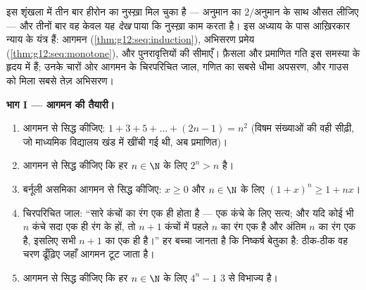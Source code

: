 \begin{problem}
\label{pb:g12:seq:1}
इस शृंखला में तीन बार हीरोन का नुस्ख़ा मिल चुका है --- अनुमान का $2/\text{अनुमान}$ के साथ
औसत लीजिए --- और तीनों बार वह केवल यह \emph{देख} पाया कि नुस्ख़ा काम करता
है। इस अध्याय के पास आख़िरकार न्याय के यंत्र हैं: आगमन (\cref{thm:g12:seq:induction}), 
अभिसरण प्रमेय (\cref{thm:g12:seq:monotone}), और पुनरावृत्तियों की सीमाएँ। फ़ैसला और प्रमाणित गति
इस समस्या के हृदय में हैं; उनके चारों ओर आगमन के चिरपरिचित जाल, गणित का
सबसे धीमा अपसरण, और गाउस को मिला सबसे तेज़ अभिसरण।

\medskip
\noindent\textbf{भाग I --- आगमन की तैयारी।}
\begin{enumerate}
  \item आगमन से सिद्ध कीजिए: $1 + 3 + 5 + \dots + (2n - 1) = n^2$ (विषम संख्याओं की वही सीढ़ी, जो माध्यमिक
        विद्यालय खंड में खींची गई थी, अब प्रमाणित)।
  \item आगमन से सिद्ध कीजिए कि हर $n \in \N$ के लिए $2^n > n$ है।
  \item बर्नूली असमिका आगमन से सिद्ध कीजिए: $x \geq 0$ और $n \in \N$ के लिए $(1 + x)^n \geq 1 + nx$।
  \item चिरपरिचित जाल: ``सारे कंचों का रंग एक ही होता है --- एक कंचे के लिए
        सत्य; और यदि कोई भी $n$ कंचे सदा एक ही रंग के हों, तो $n + 1$ कंचों
        में पहले $n$ का रंग एक है और अंतिम $n$ का रंग एक है, इसलिए
        सभी $n + 1$ का एक ही है।'' हर बच्चा जानता है कि निष्कर्ष बेतुका है:
        ठीक-ठीक वह चरण ढूँढ़िए जहाँ आगमन टूट जाता है।
  \item आगमन से सिद्ध कीजिए कि हर $n \in \N$ के लिए $4^n - 1$ $3$ से विभाज्य है।
\end{enumerate}


\end{problem}
